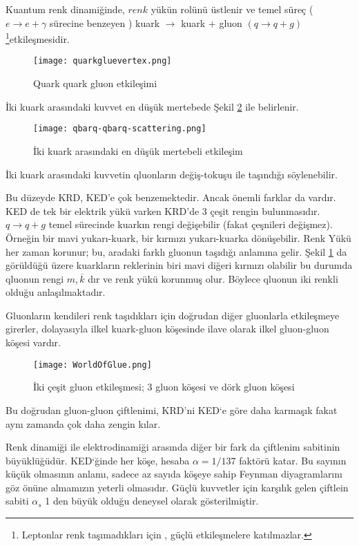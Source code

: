 \par Kuantum renk dinamiğinde, $renk$ yükün rolünü üstlenir ve temel süreç ($e \rightarrow e + \gamma$ sürecine benzeyen ) kuark $\rightarrow$ kuark + gluon $(q \rightarrow q + g)$\footnote{Leptonlar renk taşımadıkları için , güçlü etkileşmelere katılmazlar.}etkileşmesidir. 
\begin{figure}[!htbp]
\centering
\texttt{[image: quarkgluevertex.png]}
\caption{Quark quark gluon etkileşimi}
\label{fig:quark}
\end{figure}
İki kuark arasındaki kuvvet en düşük mertebede Şekil \ref{fig:etkilesim} ile belirlenir.
\begin{figure}[!htbp]
\centering
\texttt{[image: qbarq-qbarq-scattering.png]}
\caption{İki kuark arasındaki en düşük mertebeli etkileşim}
\label{fig:etkilesim}
\end{figure}
İki kuark arasındaki kuvvetin qluonların değiş-tokuşu ile taşındığı söylenebilir.
\par Bu düzeyde KRD, KED'e çok benzemektedir. Ancak önemli farklar da vardır. KED de tek bir elektrik yükü varken KRD'de $3$ çeşit rengin bulunmasıdır. $q \rightarrow q + g $ temel sürecinde kuarkın rengi değişebilir (fakat çeşnileri değişmez). Örneğin bir mavi yukarı-kuark, bir kırmızı yukarı-kuarka dönüşebilir. Renk Yükü her zaman korunur; bu, aradaki farklı gluonun taşıdığı anlamına gelir. Şekil \ref{fig:quark} da görüldüğü üzere kuarkların reklerinin biri mavi diğeri kırmızı olabilir bu durumda qluonun rengi $m , \overline{k}$ dır ve renk yükü korunmuş olur. Böylece qluonun iki renkli olduğu anlaşılmaktadır.
\par Gluonların kendileri renk taşıdıkları için doğrudan diğer gluonlarla etkileşmeye girerler, dolayasıyla ilkel kuark-gluon köşesinde ilave olarak ilkel gluon-gluon köşesi vardır.
\begin{figure}[!htbp]
\centering
\texttt{[image: WorldOfGlue.png]}
\caption{İki çeşit gluon etkileşmesi; 3 gluon köşesi ve dörk gluon köşesi}
\end{figure}
Bu doğrudan gluon-gluon çiftlenimi, KRD'ni KED`e göre daha karmaşık fakat aynı zamanda çok daha zengin kılar.
\par Renk dinamiği ile elektrodinamiği arasında diğer bir fark da çiftlenim sabitinin büyüklüğüdür. KED`ğinde her köşe, hesaba $\alpha =1/137$ faktörü katar. Bu sayının küçük olmasının anlamı, sadece az sayıda köşeye sahip Feynman diyagramlarını göz önüne almamızın yeterli olmasıdır. Güçlü kuvvetler için karşılık gelen çiftlein sabiti $\alpha_s$ 1 den büyük olduğu deneysel olarak gösterilmiştir.
